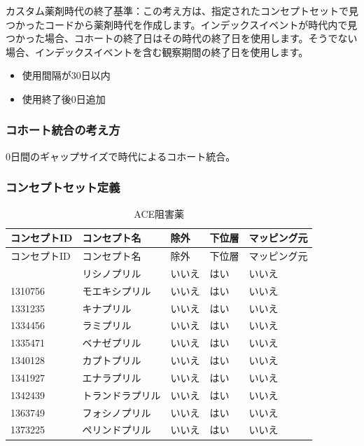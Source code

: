\documentclass[
  11pt]{book}
\providecommand{\tightlist}{%
  \setlength{\itemsep}{0pt}\setlength{\parskip}{0pt}}
\theoremstyle{definition}
\theoremstyle{definition}
\theoremstyle{definition}
\theoremstyle{definition}
\theoremstyle{remark}
\begin{document}
カスタム薬剤時代の終了基準：この考え方は、指定されたコンセプトセットで見つかったコードから薬剤時代を作成します。インデックスイベントが時代内で見つかった場合、コホートの終了日はその時代の終了日を使用します。そうでない場合、インデックスイベントを含む観察期間の終了日を使用します。

\begin{itemize}
\tightlist
\item
  使用間隔が30日以内
\item
  使用終了後0日追加
\end{itemize}

\subsubsection*{コホート統合の考え方}\label{ux30b3ux30dbux30fcux30c8ux7d71ux5408ux306eux8003ux3048ux65b9}

0日間のギャップサイズで時代によるコホート統合。

\subsubsection*{コンセプトセット定義}\label{ux30b3ux30f3ux30bbux30d7ux30c8ux30bbux30c3ux30c8ux5b9aux7fa9-1}

\begin{longtable}[]{@{}lllll@{}}
\caption{\label{tab:aceInhibitorsMono} ACE阻害薬}\tabularnewline
\toprule\noalign{}
コンセプトID & コンセプト名 & 除外 & 下位層 & マッピング元 \\
\midrule\noalign{}
\endfirsthead
\toprule\noalign{}
コンセプトID & コンセプト名 & 除外 & 下位層 & マッピング元 \\
\midrule\noalign{}
\endhead
\bottomrule\noalign{}
\endlastfoot
1308216 & リシノプリル & いいえ & はい & いいえ \\
1310756 & モエキシプリル & いいえ & はい & いいえ \\
1331235 & キナプリル & いいえ & はい & いいえ \\
1334456 & ラミプリル & いいえ & はい & いいえ \\
1335471 & ベナゼプリル & いいえ & はい & いいえ \\
1340128 & カプトプリル & いいえ & はい & いいえ \\
1341927 & エナラプリル & いいえ & はい & いいえ \\
1342439 & トランドラプリル & いいえ & はい & いいえ \\
1363749 & フォシノプリル & いいえ & はい & いいえ \\
1373225 & ペリンドプリル & いいえ & はい & いいえ \\
\end{longtable}
\end{document}
